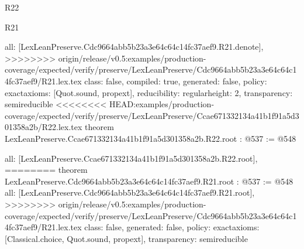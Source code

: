 \begin{lexlean}{R22}
\begin{lexlean}{R21}
\begin{coremodule}
{{{{{  all: [LexLeanPreserve.Cdc9664abb5b23a3e64c64c14fc37aef9.R21.denote],
>>>>>>>> origin/release/v0.5:examples/production-coverage/expected/verify/preserve/LexLeanPreserve/Cdc9664abb5b23a3e64c64c14fc37aef9/R21.lex.tex
  class: false,
  compiled: true,
  generated: false,
  policy: exact{axioms: [Quot.sound, propext]},
  reducibility: regular{height: 2},
  transparency: semireducible
}
<<<<<<<< HEAD:examples/production-coverage/expected/verify/preserve/LexLeanPreserve/Ccae671332134a41b1f91a5d301358a2b/R22.lex.tex
theorem LexLeanPreserve.Ccae671332134a41b1f91a5d301358a2b.R22.root : @537 := @548 {
  all: [LexLeanPreserve.Ccae671332134a41b1f91a5d301358a2b.R22.root],
========
theorem LexLeanPreserve.Cdc9664abb5b23a3e64c64c14fc37aef9.R21.root : @537 := @548 {
  all: [LexLeanPreserve.Cdc9664abb5b23a3e64c64c14fc37aef9.R21.root],
>>>>>>>> origin/release/v0.5:examples/production-coverage/expected/verify/preserve/LexLeanPreserve/Cdc9664abb5b23a3e64c64c14fc37aef9/R21.lex.tex
  class: false,
  generated: false,
  policy: exact{axioms: [Classical.choice, Quot.sound, propext]},
  transparency: semireducible
}

}}}}}
\end{coremodule}
\end{lexlean}
\end{lexlean}
